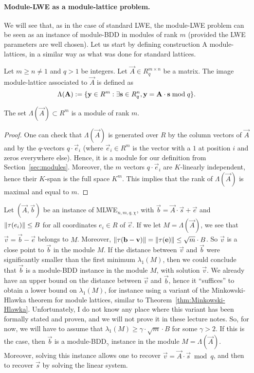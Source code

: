 \paragraph{Module-LWE as a module-lattice problem.} We will see that, as in the case of standard LWE, the module-LWE problem can be seen as an instance of module-BDD in modules of rank $m$ (provided the LWE parameters are well chosen).
Let us start by defining construction A module-lattices, in a similar way as what was done for standard lattices.

\begin{definition}
Let $m \geq n \neq 1$ and $q > 1$ be integers. Let $\vec A \in R_q^{m \times n}$ be a matrix. The image module-lattice associated to $\vec A$ is defined as
\[ \Lambda(\vec A) := \{ \vec y \in R^m: \exists {\bf s} \in R_q^n, {\bf y} = {\bf A}\cdot {\bf s} \bmod q\}.\]
\end{definition}

\begin{lemma}
The set $\Lambda(\vec A) \subset R^m$ is a module of rank $m$.
\end{lemma}

\begin{proof}
One can check that $\Lambda(\vec A)$ is generated over $R$ by the column vectors of $\vec A$ and by the $q$-vectors $q \cdot \vec e_i$ (where $\vec e_i \in R^m$ is the vector with a $1$ at position $i$ and zeros everywhere else). Hence, it is a module for our definition from Section~\ref{sec:modules}.
Moreover, the $m$ vectors $q \cdot \vec e_i$ are $K$-linearly independent, hence their $K$-span is the full space $K^m$. This implies that the rank of $\Lambda(\vec A)$ is maximal and equal to $m$.
\end{proof}

Let $(\vec A, \vec b)$ be an instance of MLWE$_{n,m,q,\chi}$, with $\vec b = \vec A \cdot \vec s + \vec e$ and $\|\mink(e_i)\| \leq B$ for all coordinates $e_i \in R$ of $\vec e$. If we let $M = \Lambda(\vec A)$, we see that $\vec v = \vec b - \vec e$ belongs to $M$. Moreover, $\|\tau(\vec b - \vec v)\| =  \| \mink(\vec e)\| \leq \sqrt{m} \cdot B$. So $\vec v$ is a close point to $\vec b$ in the module $M$. If the distance between $\vec v$ and $\vec b$ were significantly smaller than the first minimum $\lambda_1(M)$, then we could conclude that $\vec b$ is a module-BDD instance in the module $M$, with solution $\vec v$. We already have an upper bound on the distance between $\vec v$ and $\vec b$, hence it ``suffices'' to obtain a lower bound on $\lambda_1(M)$, for instance using a variant of the Minkowski-Hlawka theorem for module lattices, similar to Theorem~\ref{thm:Minkowski-Hlawka}. Unfortunately, I do not know any place where this variant has been formally stated and proven, and we will not prove it in these lecture notes. So, for now, we will have to assume that $\lambda_1(M) \geq \gamma \cdot \sqrt{m} \cdot B $ for some $\gamma >2$. If this is the case, then $\vec b$ is a module-BDD$_\gamma$ instance in the module $M = \Lambda(\vec A)$. Moreover, solving this instance allows one to recover $\vec v = \vec A \cdot \vec s \bmod q$, and then to recover $\vec s$ by solving the linear system.

